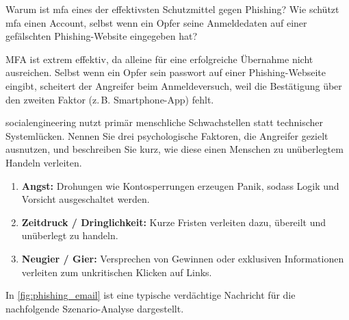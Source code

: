 \documentclass[12pt,a4paper]{article}
\newcounter{subsubsubsection}[subsubsection]
\begin{document}
\newpage

\begin{taskbox}
Warum ist \gls{mfa} eines der effektivsten Schutzmittel gegen Phishing? \newline Wie schützt \gls{mfa} einen Account, selbst wenn ein Opfer seine Anmeldedaten auf einer gefälschten Phishing-Website eingegeben hat?
\end{taskbox}

\begin{solutionbox}[Musterlösung 2.3.2.1.3]
MFA ist extrem effektiv, da  alleine für eine erfolgreiche Übernahme nicht ausreichen. Selbst wenn ein Opfer sein \gls{passwort} auf einer Phishing-Webseite eingibt, scheitert der Angreifer beim Anmeldeversuch, weil die Bestätigung über den zweiten Faktor (z.\,B. Smartphone-App) fehlt.
\end{solutionbox}

\newpage


\begin{taskbox}
\gls{socialengineering} nutzt primär menschliche Schwachstellen statt technischer \mbox{Systemlücken}. Nennen Sie drei psychologische Faktoren, die \mbox{Angreifer} \mbox{gezielt} \mbox{ausnutzen,} und beschreiben Sie kurz, wie diese einen Menschen zu \mbox{unüberlegtem} \mbox{Handeln} verleiten.
\end{taskbox}

\begin{solutionbox}[Musterlösung 2.3.2.2.1]
\begin{enumerate}
    \item \textbf{Angst:} Drohungen wie Kontosperrungen erzeugen Panik, sodass Logik und Vorsicht ausgeschaltet werden.
    \item \textbf{Zeitdruck / Dringlichkeit:} Kurze Fristen verleiten dazu, übereilt und \mbox{unüberlegt} zu handeln.
    \item \textbf{Neugier / Gier:} Versprechen von Gewinnen oder exklusiven Informationen verleiten zum unkritischen Klicken auf Links.
\end{enumerate}
\end{solutionbox}

In \cref{fig:phishing_email} ist eine typische verdächtige Nachricht für die nachfolgende \newline Szenario-Analyse dargestellt.
\end{document}
